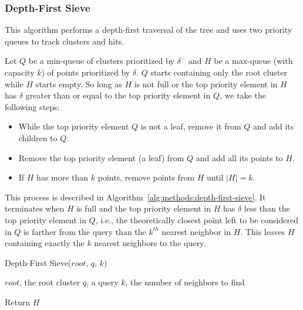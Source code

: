 \subsubsection{Depth-First Sieve}
\label{sec:methods:knn-search:depth-first-sieve}

This algorithm performs a depth-first traversal of the tree and uses two priority queues to track clusters and hits.

Let $Q$ be a min-queue of clusters prioritized by $\delta^{-}$ and $H$ be a max-queue (with capacity $k$) of points prioritized by $\delta$.
$Q$ starts containing only the root cluster while $H$ starts empty.
So long as $H$ is not full or the top priority element in $H$ has $\delta$ greater than or equal to the top priority element in $Q$, we take the following steps:

\begin{itemize}
    \item While the top priority element $Q$ is not a leaf, remove it from $Q$ and add its children to $Q$.
    \item Remove the top priority element (a leaf) from $Q$ and add all its points to $H$.
    \item If $H$ has more than $k$ points, remove points from $H$ until $|H| = k$.
\end{itemize}

This process is described in Algorithm~\ref{alg:methods:depth-first-sieve}.
It terminates when $H$ is full and the top priority element in $H$ has $\delta$ less than the top priority element in $Q$, i.e., the theoretically closest point left to be considered in $Q$ is farther from the query than the $k^{th}$ nearest neighbor in $H$.
This leaves $H$ containing exactly the $k$ nearest neighbors to the query.


\begin{algorithm} 
    \caption{Depth-First Sieve($root$, $q$, $k$)} 
    \label{alg:methods:depth-first-sieve} 
    \begin{algorithmic}
        \REQUIRE $root$, the root cluster
        \REQUIRE $q$, a query
        \REQUIRE $k$, the number of neighbors to find


            \ENDWHILE
            \ENDFOR
            \ENDWHILE
        \ENDWHILE
        \STATE Return $H$
    \end{algorithmic}
\end{algorithm}

